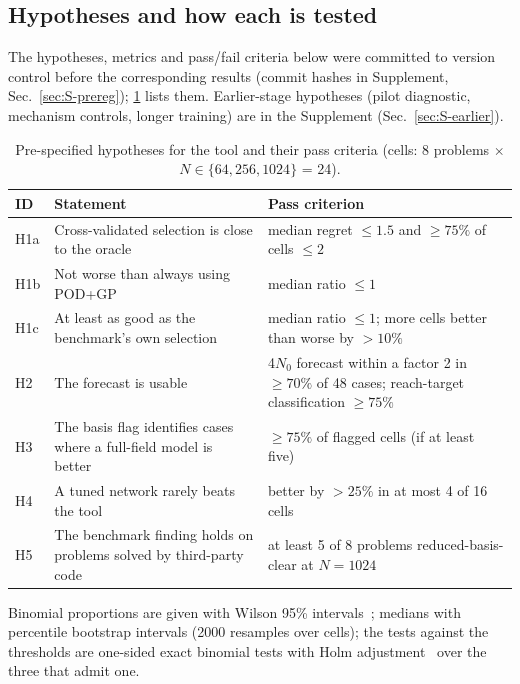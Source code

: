 \subsection{Hypotheses and how each is tested}
The hypotheses, metrics and pass/fail criteria below were committed to version control before the corresponding results (commit hashes in Supplement, Sec.~\ref{sec:S-prereg}); \cref{tab:hyp} lists them. Earlier-stage hypotheses (pilot diagnostic, mechanism controls, longer training) are in the Supplement (Sec.~\ref{sec:S-earlier}).
\begin{table}[t]\centering\caption{Pre-specified hypotheses for the tool and their pass criteria (cells: 8 problems $\times$ $N\in\{64,256,1024\}$ = 24).}\label{tab:hyp}\small
\begin{tabularx}{\textwidth}{lXX}\toprule ID & Statement & Pass criterion\\\midrule
H1a & Cross-validated selection is close to the oracle & median regret $\le1.5$ and $\ge75\%$ of cells $\le2$\\
H1b & Not worse than always using POD+GP & median ratio $\le1$\\
H1c & At least as good as the benchmark's own selection & median ratio $\le1$; more cells better than worse by $>10\%$\\
H2 & The forecast is usable & 4$N_0$ forecast within a factor 2 in $\ge70\%$ of 48 cases; reach-target classification $\ge75\%$\\
H3 & The basis flag identifies cases where a full-field model is better & $\ge75\%$ of flagged cells (if at least five)\\
H4 & A tuned network rarely beats the tool & better by $>25\%$ in at most 4 of 16 cells\\
H5 & The benchmark finding holds on problems solved by third-party code & at least 5 of 8 problems reduced-basis-clear at $N=1024$\\
\bottomrule\end{tabularx}\end{table}
Binomial proportions are given with Wilson 95\% intervals~\cite{wilson1927}; medians with percentile bootstrap intervals (2000 resamples over cells); the tests against the thresholds are one-sided exact binomial tests with Holm adjustment~\cite{holm1979} over the three that admit one.
